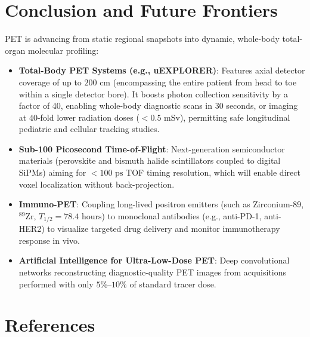 \documentclass[11pt,a4paper]{article}
\begin{document}
\section{Conclusion and Future Frontiers}

PET is advancing from static regional snapshots into dynamic, whole-body total-organ molecular profiling:
\begin{itemize}[leftmargin=*]
    \item \textbf{Total-Body PET Systems (e.g., uEXPLORER)}: Features axial detector coverage of up to $200\text{ cm}$ (encompassing the entire patient from head to toe within a single detector bore). It boosts photon collection sensitivity by a factor of 40, enabling whole-body diagnostic scans in 30 seconds, or imaging at 40-fold lower radiation doses ($<0.5\text{ mSv}$), permitting safe longitudinal pediatric and cellular tracking studies.
    \item \textbf{Sub-100 Picosecond Time-of-Flight}: Next-generation semiconductor materials (perovskite and bismuth halide scintillators coupled to digital SiPMs) aiming for $<100\text{ ps}$ TOF timing resolution, which will enable direct voxel localization without back-projection.
    \item \textbf{Immuno-PET}: Coupling long-lived positron emitters (such as Zirconium-89, $^{89}\text{Zr}$, $T_{1/2} = 78.4\text{ hours}$) to monoclonal antibodies (e.g., anti-PD-1, anti-HER2) to visualize targeted drug delivery and monitor immunotherapy response in vivo.
    \item \textbf{Artificial Intelligence for Ultra-Low-Dose PET}: Deep convolutional networks reconstructing diagnostic-quality PET images from acquisitions performed with only $5\%\text{--}10\%$ of standard tracer dose.
\end{itemize}

\section*{References}
\end{document}
